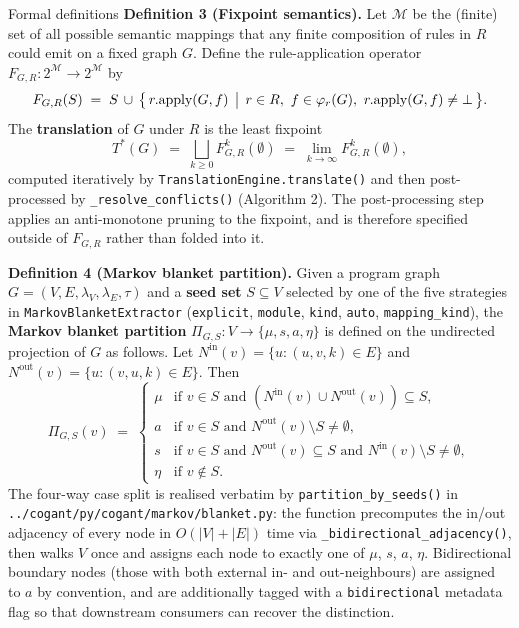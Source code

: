 \documentclass[
  ignorenonframetext,
]{beamer}
\begin{document}
\begin{frame}[fragile]{Formal definitions}
\textbf{Definition 3 (Fixpoint semantics).} Let \(\mathcal{M}\) be the
(finite) set of all possible semantic mappings that any finite
composition of rules in \(R\) could emit on a fixed graph \(G\). Define
the rule-application operator
\(F_{G,R} : 2^{\mathcal{M}} \to 2^{\mathcal{M}}\) by \begin{equation}
\label{eq:fixpoint-operator}
F_{G,R}(S) \;=\; S \,\cup\, \bigl\{\, r.\text{apply}(G, f) \,\bigm|\, r \in R,\ f \in \varphi_r(G),\ r.\text{apply}(G, f) \neq \bot \,\bigr\}.
\end{equation} The \textbf{translation} of \(G\) under \(R\) is the
least fixpoint \begin{equation}
\label{eq:least-fixpoint}
T^{*}(G) \;=\; \bigsqcup_{k \geq 0} F_{G,R}^{k}(\emptyset) \;=\; \lim_{k \to \infty} F_{G,R}^{k}(\emptyset),
\end{equation} computed iteratively by
\texttt{TranslationEngine.translate()} and then post-processed by
\texttt{\_resolve\_conflicts()} (Algorithm 2). The post-processing step
applies an anti-monotone pruning to the fixpoint, and is therefore
specified outside of \(F_{G,R}\) rather than folded into it.

\textbf{Definition 4 (Markov blanket partition).} Given a program graph
\(G = (V, E, \lambda_V, \lambda_E, \tau)\) and a \textbf{seed set}
\(S \subseteq V\) selected by one of the five strategies in
\texttt{MarkovBlanketExtractor} (\texttt{explicit}, \texttt{module},
\texttt{kind}, \texttt{auto}, \texttt{mapping\_kind}), the
\textbf{Markov blanket partition}
\(\Pi_{G, S} : V \to \{\mu, s, a, \eta\}\) is defined on the undirected
projection of \(G\) as follows. Let
\(N^{\text{in}}(v) = \{u : (u, v, k) \in E\}\) and
\(N^{\text{out}}(v) = \{u : (v, u, k) \in E\}\). Then \begin{equation}
\label{eq:markov-partition}
\Pi_{G,S}(v) \;=\;
\begin{cases}
\mu & \text{if } v \in S \text{ and } (N^{\text{in}}(v) \cup N^{\text{out}}(v)) \subseteq S, \\
a   & \text{if } v \in S \text{ and } N^{\text{out}}(v) \setminus S \neq \emptyset, \\
s   & \text{if } v \in S \text{ and } N^{\text{out}}(v) \subseteq S \text{ and } N^{\text{in}}(v) \setminus S \neq \emptyset, \\
\eta & \text{if } v \notin S.
\end{cases}
\end{equation} The four-way case split is realised verbatim by
\texttt{partition\_by\_seeds()} in
\texttt{../cogant/py/cogant/markov/blanket.py}: the function precomputes
the in/out adjacency of every node in \(O(|V| + |E|)\) time via
\texttt{\_bidirectional\_adjacency()}, then walks \(V\) once and assigns
each node to exactly one of \(\mu\), \(s\), \(a\), \(\eta\).
Bidirectional boundary nodes (those with both external in- and
out-neighbours) are assigned to \(a\) by convention, and are
additionally tagged with a \texttt{bidirectional} metadata flag so that
downstream consumers can recover the distinction.


\end{frame}
\end{document}
